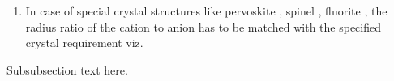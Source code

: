 \documentclass[journal]{IEEEtran}
\begin{document}
\begin{multicols}{2}
\begin{enumerate}
{		Using the above derived values of the radius and the molar ratio calculation, we concluded for $Ga_2 O_3$
		with $m = 0.04$ }






	\item{In case of special crystal structures like pervoskite , spinel , fluorite , the radius ratio of the cation to anion has to be matched with the specified crystal requirement viz. }
\end{enumerate}



Subsubsection text here.


%
%



%
%





\end{multicols}
\end{document}
